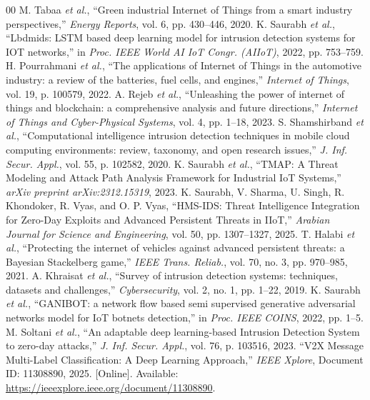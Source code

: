 \documentclass[conference]{IEEEtran}
\begin{document}
\begin{thebibliography}{00}
 M. Tabaa \textit{et al.}, ``Green industrial Internet of Things from a smart industry perspectives,'' \textit{Energy Reports}, vol. 6, pp. 430--446, 2020.
 K. Saurabh \textit{et al.}, ``Lbdmids: LSTM based deep learning model for intrusion detection systems for IOT networks,'' in \textit{Proc. IEEE World AI IoT Congr. (AIIoT)}, 2022, pp. 753--759.
 H. Pourrahmani \textit{et al.}, ``The applications of Internet of Things in the automotive industry: a review of the batteries, fuel cells, and engines,'' \textit{Internet of Things}, vol. 19, p. 100579, 2022.
 A. Rejeb \textit{et al.}, ``Unleashing the power of internet of things and blockchain: a comprehensive analysis and future directions,'' \textit{Internet of Things and Cyber-Physical Systems}, vol. 4, pp. 1--18, 2023.
 S. Shamshirband \textit{et al.}, ``Computational intelligence intrusion detection techniques in mobile cloud computing environments: review, taxonomy, and open research issues,'' \textit{J. Inf. Secur. Appl.}, vol. 55, p. 102582, 2020.
 K. Saurabh \textit{et al.}, ``TMAP: A Threat Modeling and Attack Path Analysis Framework for Industrial IoT Systems,'' \textit{arXiv preprint arXiv:2312.15319}, 2023.
 K. Saurabh, V. Sharma, U. Singh, R. Khondoker, R. Vyas, and O. P. Vyas, ``HMS-IDS: Threat Intelligence Integration for Zero-Day Exploits and Advanced Persistent Threats in IIoT,'' \textit{Arabian Journal for Science and Engineering}, vol. 50, pp. 1307--1327, 2025.
 T. Halabi \textit{et al.}, ``Protecting the internet of vehicles against advanced persistent threats: a Bayesian Stackelberg game,'' \textit{IEEE Trans. Reliab.}, vol. 70, no. 3, pp. 970--985, 2021.
 A. Khraisat \textit{et al.}, ``Survey of intrusion detection systems: techniques, datasets and challenges,'' \textit{Cybersecurity}, vol. 2, no. 1, pp. 1--22, 2019.
 K. Saurabh \textit{et al.}, ``GANIBOT: a network flow based semi supervised generative adversarial networks model for IoT botnets detection,'' in \textit{Proc. IEEE COINS}, 2022, pp. 1--5.
 M. Soltani \textit{et al.}, ``An adaptable deep learning-based Intrusion Detection System to zero-day attacks,'' \textit{J. Inf. Secur. Appl.}, vol. 76, p. 103516, 2023.
 ``V2X Message Multi-Label Classification: A Deep Learning Approach,'' \textit{IEEE Xplore}, Document ID: 11308890, 2025. [Online]. Available: \url{https://ieeexplore.ieee.org/document/11308890}.

\end{thebibliography}
\end{document}
